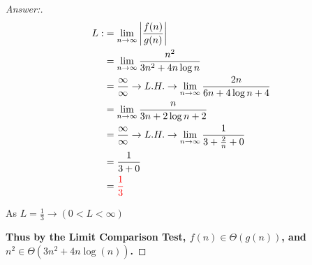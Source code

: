 \documentclass[11pt]{article}
\theoremstyle{definition}
\theoremstyle{definition}
\theoremstyle{definition}
\begin{document}
\begin{proof}[Answer:] \
\begin{align*}
L :&= \lim_{n \to \infty} \left| \frac{f(n)}{g(n)} \right| \\
&= \lim_{n \to \infty} \frac{n^{2}}{3n^{2} + 4n \log{n}} \\
&= \frac{\infty}{\infty} \to L.H. \to \lim_{n \to \infty} \frac{2n}{6n + 4 \log{n} + 4} \\
&= \lim_{n \to \infty} \frac{n}{3n + 2 \log{n} + 2} \\
&= \frac{\infty}{\infty} \to L.H. \to \lim_{n \to \infty} \frac{1}{3 + \frac{2}{n} + 0} \\
&= \frac{1}{3 + 0} \\
&= \color{red}\frac{1}{3} \\
\end{align*}
\item As $L = \frac{1}{3} \to (0 < L < \infty)$ \\
\item \textbf{Thus by the Limit Comparison Test, $f(n) \in \Theta(g(n))$, and \color{red}$n^{2} \in \Theta(3n^{2} + 4n \log(n))$.}
\end{proof}



\end{document}
